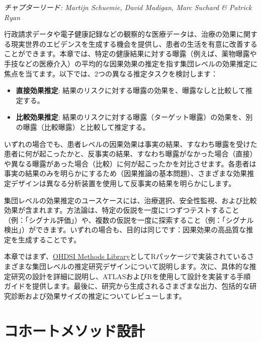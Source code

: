 \documentclass[
  11pt]{book}
\providecommand{\tightlist}{%
  \setlength{\itemsep}{0pt}\setlength{\parskip}{0pt}}
\theoremstyle{definition}
\theoremstyle{definition}
\theoremstyle{definition}
\theoremstyle{definition}
\theoremstyle{remark}
\begin{document}
\emph{チャプターリード: Martijn Schuemie, David Madigan, Marc Suchard \& Patrick Ryan}


行政請求データや電子健康記録などの観察的な医療データは、治療の効果に関する現実世界のエビデンスを生成する機会を提供し、患者の生活を有意に改善することができます。本章では、特定の健康結果に対する曝露（例えば、薬物曝露や手技などの医療介入）の平均的な因果効果の推定を指す集団レベルの効果推定に焦点を当てます。以下では、2つの異なる推定タスクを検討します：

\begin{itemize}
\tightlist
\item
  \textbf{直接効果推定}: 結果のリスクに対する曝露の効果を、曝露なしと比較して推定する。 
\item
  \textbf{比較効果推定}: 結果のリスクに対する曝露（ターゲット曝露）の効果を、別の曝露（比較曝露）と比較して推定する。 
\end{itemize}

いずれの場合でも、患者レベルの因果効果は事実の結果、すなわち曝露を受けた患者に何が起こったかと、反事実の結果、すなわち曝露がなかった場合（直接）や異なる曝露があった場合（比較）に何が起こったかを対比させます。各患者は事実の結果のみを明らかにするため（因果推論の基本問題）、さまざまな効果推定デザインは異なる分析装置を使用して反事実の結果を明らかにします。 

集団レベルの効果推定のユースケースには、治療選択、安全性監視、および比較効果が含まれます。方法論は、特定の仮説を一度に1つずつテストすること（例：「シグナル評価」）や、複数の仮説を一度に探索すること（例：「シグナル検出」）ができます。いずれの場合も、目的は同じです：因果効果の高品質な推定を生成することです。  

本章ではまず、\href{https://ohdsi.github.io/MethodsLibrary/}{OHDSI Methods Library}としてRパッケージで実装されているさまざまな集団レベルの推定研究デザインについて説明します。次に、具体的な推定研究の設計を詳細に説明し、ATLASおよびRを使用して設計を実装する手順ガイドを提供します。最後に、研究から生成されるさまざまな出力、包括的な研究診断および効果サイズの推定についてレビューします。

\section{コホートメソッド設計}\label{CohortMethod}
\end{document}
